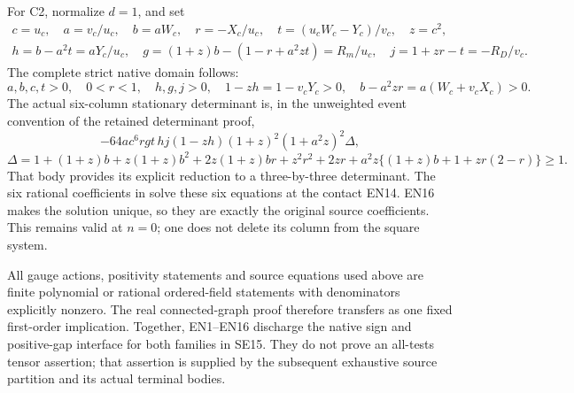 For C2, normalize \(d=1\), and set
\[
\begin{gathered}
 c=u_c,\quad a=v_c/u_c,\quad b=aW_c,\quad r=-X_c/u_c,\quad
 t=(u_cW_c-Y_c)/v_c,\quad z=c^2,\\
 h=b-a^2t=aY_c/u_c,\quad
 g=(1+z)b-(1-r+a^2zt)=R_m/u_c,\quad
 j=1+zr-t=-R_D/v_c .
\end{gathered}\tag{EN14}
\]
The complete strict native domain follows:
\[
 a,b,c,t>0,\quad 0<r<1,\quad h,g,j>0,\quad
 1-zh=1-v_cY_c>0,\quad b-a^2zr=a(W_c+v_cX_c)>0.
 \tag{EN15}
\]
The actual six-column stationary determinant is, in the unweighted
event convention of the retained determinant proof,
\[
 -64ac^6rgt\,hj(1-zh)(1+z)^2(1+a^2z)^2\Delta,
\]
\[
 \Delta=1+(1+z)b+z(1+z)b^2+2z(1+z)br+z^2r^2+2zr
        +a^2z\{(1+z)b+1+zr(2-r)\}\ge1 .
 \tag{EN16}
\]
That body provides its explicit reduction to a three-by-three
determinant.  The six rational coefficients in
 solve these six equations at the
contact EN14.  EN16 makes the solution unique, so they are exactly
the original source coefficients.  This remains valid at \(n=0\);
one does not delete its column from the square system.

All gauge actions, positivity statements and source equations used
above are finite polynomial or rational ordered-field statements
with denominators explicitly nonzero.  The real connected-graph
proof therefore transfers as one fixed first-order implication.
Together, EN1--EN16 discharge the native sign and positive-gap
interface for both families in SE15.  They do not prove an
all-tests tensor assertion; that assertion is supplied by the
subsequent exhaustive source partition and its actual terminal bodies.
